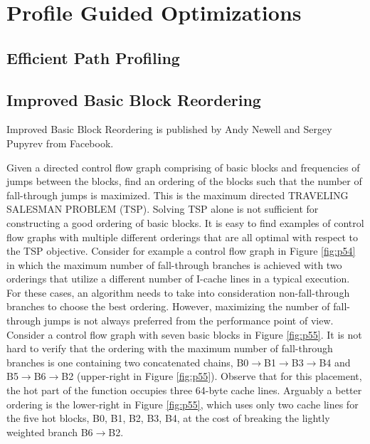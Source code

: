 \newpage


\section{Profile Guided Optimizations}


\subsection{Efficient Path Profiling}



\subsection{Improved Basic Block Reordering}

Improved Basic Block Reordering \cite{newell2020improved} is published by Andy Newell and Sergey Pupyrev
from Facebook. 


Given a directed control flow graph comprising of basic blocks and frequencies of jumps between the blocks, find an ordering
of the blocks such that the number of fall-through jumps
is maximized. This is the maximum directed TRAVELING
SALESMAN PROBLEM (TSP). Solving TSP alone is not sufficient for constructing a good ordering of basic blocks. It is easy to find
examples of control flow graphs with multiple different
orderings that are all optimal with respect to the TSP objective. Consider for example a control flow graph in Figure \ref{fig:p54}
in which the maximum number of fall-through branches is
achieved with two orderings that utilize a different number
of I-cache lines in a typical execution. For these cases, an
algorithm needs to take into consideration non-fall-through
branches to choose the best ordering. However, maximizing the number of fall-through jumps is not always preferred
from the performance point of view. Consider a control
flow graph with seven basic blocks in Figure \ref{fig:p55}. It is not hard
to verify that the ordering with the maximum number of
fall-through branches is one containing two concatenated
chains, B0$\rightarrow$B1$\rightarrow$B3$\rightarrow$B4 and B5$\rightarrow$B6$\rightarrow$B2 (upper-right in
Figure \ref{fig:p55}). Observe that for this placement, the hot part of
the function occupies three 64-byte cache lines. Arguably a
better ordering is the lower-right in Figure \ref{fig:p55}, which uses only
two cache lines for the five hot blocks, B0, B1, B2, B3, B4, at
the cost of breaking the lightly weighted branch B6$\rightarrow$B2.



